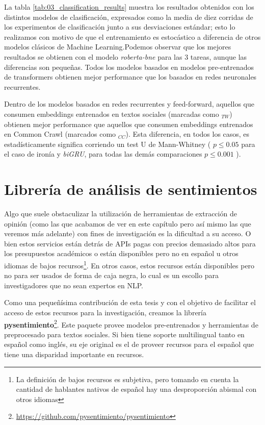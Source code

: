 La tabla \ref{tab:03_classification_results} muestra los resultados obtenidos con los distintos modelos de clasificación, expresados como la media de diez corridas de los experimentos de clasificación junto a sus desviaciones estándar; esto lo realizamos con motivo de que el entrenamiento es estocástico a diferencia de otros modelos clásicos de Machine Learning.Podemos observar que los mejores resultados se obtienen con el modelo \emph{roberta-bne} para las 3 tareas, aunque las diferencias son pequeñas. Todos los modelos basados en modelos pre-entrenados de transformers obtienen mejor performance que los basados en redes neuronales recurrentes.

Dentro de los modelos basados en redes recurrentes y feed-forward, aquellos que consumen embeddings entrenados en textos sociales (marcadas como $_{TW}$) obtienen mejor performance que aquellos que consumen embeddings entrenados en Common Crawl (marcados como $_{CC}$). Esta diferencia, en todos los casos, es estadísticamente significa corriendo un test U de Mann-Whitney ( $p \leq 0.05$ para el caso de ironía y \emph{biGRU}, para todas las demás comparaciones $p \leq 0.001$ ).




\section{Librería de análisis de sentimientos}

\newcommand{\pysentimiento}[0]{\textbf{pysentimiento}}

Algo que suele obstaculizar la utilización de herramientas de extracción de opinión (como las que acabamos de ver en este capítulo pero así mismo las que veremos más adelante) con fines de investigación es la dificultad a su acceso. O bien estos servicios están detrás de APIs pagas con precios demasiado altos para los presupuestos académicos o están disponibles pero no en español u otros idiomas de bajos recursos\footnote{La definición de bajos recursos es subjetiva, pero tomando en cuenta la cantidad de hablantes nativos de español hay una desproporción abismal con otros idiomas}. En otros casos, estos recursos están disponibles pero no para ser usados de forma de caja negra, lo cual es un escollo para investigadores que no sean expertos en NLP.

Como una pequeñísima contribución de esta tesis y con el objetivo de facilitar el acceso de estos recursos para la investigación, creamos la librería \textbf{pysentimiento}\footnote{\url{https://github.com/pysentimiento/pysentimiento}}. Este paquete provee modelos pre-entrenados y herramientas de preprocesado para textos sociales. Si bien tiene soporte multilingual tanto en español como inglés, su eje original es el de proveer recursos para el español que tiene una disparidad importante en recursos.

